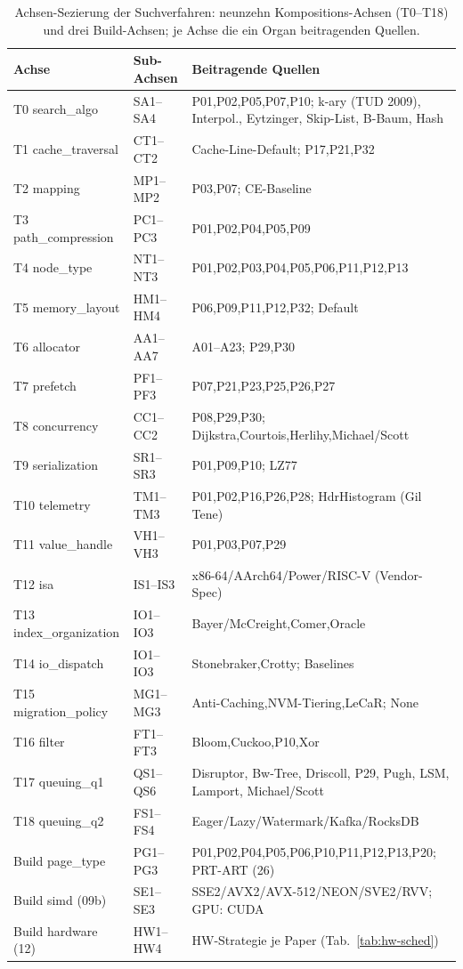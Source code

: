 \begin{table}[!htbp]
  \caption{Achsen-Sezierung der Suchverfahren: neunzehn Kompositions-Achsen (T0--T18) und drei
  Build-Achsen; je Achse die ein Organ beitragenden Quellen.}\label{tab:axes-overview}
  \centering\footnotesize
  \begin{tabular}{@{}l l p{6.8cm}@{}}
    \toprule
    \textbf{Achse} & \textbf{Sub-Achsen} & \textbf{Beitragende Quellen} \\
    \midrule
    T0 search\_algo & SA1--SA4 & P01,P02,P05,P07,P10; k-ary (TUD 2009), Interpol., Eytzinger, Skip-List, B-Baum, Hash \\
    T1 cache\_traversal & CT1--CT2 & Cache-Line-Default; P17,P21,P32 \\
    T2 mapping & MP1--MP2 & P03,P07; CE-Baseline \\
    T3 path\_compression & PC1--PC3 & P01,P02,P04,P05,P09 \\
    T4 node\_type & NT1--NT3 & P01,P02,P03,P04,P05,P06,P11,P12,P13 \\
    T5 memory\_layout & HM1--HM4 & P06,P09,P11,P12,P32; Default \\
    T6 allocator & AA1--AA7 & A01--A23; P29,P30 \\
    T7 prefetch & PF1--PF3 & P07,P21,P23,P25,P26,P27 \\
    T8 concurrency & CC1--CC2 & P08,P29,P30; Dijkstra,Courtois,Herlihy,Michael/Scott \\
    T9 serialization & SR1--SR3 & P01,P09,P10; LZ77 \\
    \midrule
    T10 telemetry & TM1--TM3 & P01,P02,P16,P26,P28; HdrHistogram (Gil Tene) \\
    T11 value\_handle & VH1--VH3 & P01,P03,P07,P29 \\
    T12 isa & IS1--IS3 & x86-64/AArch64/Power/RISC-V (Vendor-Spec) \\
    T13 index\_organization & IO1--IO3 & Bayer/McCreight,Comer,Oracle \\
    T14 io\_dispatch & IO1--IO3 & Stonebraker,Crotty; Baselines \\
    T15 migration\_policy & MG1--MG3 & Anti-Caching,NVM-Tiering,LeCaR\@; None \\
    T16 filter & FT1--FT3 & Bloom,Cuckoo,P10,Xor \\
    T17 queuing\_q1 & QS1--QS6 & Disruptor, Bw-Tree, Driscoll, P29, Pugh, LSM, Lamport, Michael/Scott \\
    T18 queuing\_q2 & FS1--FS4 & Eager/Lazy/Watermark/Kafka/RocksDB \\
    \midrule
    Build page\_type & PG1--PG3 & P01,P02,P04,P05,P06,P10,P11,P12,P13,P20; PRT-ART (26) \\
    Build simd (09b) & SE1--SE3 & SSE2/AVX2/AVX-512/NEON/SVE2/RVV\@; GPU\@: CUDA \\
    Build hardware (12) & HW1--HW4 & HW-Strategie je Paper (Tab.~\ref{tab:hw-sched}) \\
    \bottomrule
  \end{tabular}
\end{table}

